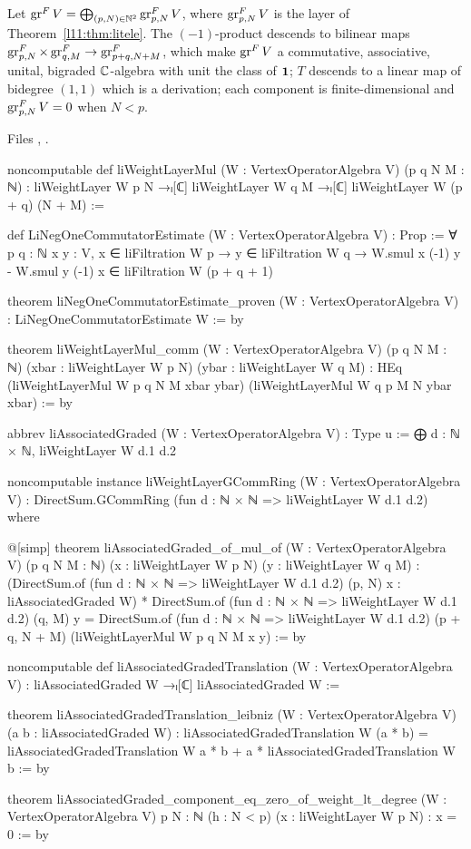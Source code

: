 \begin{theorem}\label{l11:thm:ligr}
Let $\operatorname{gr}^FV = \bigoplus_{(p,N)\in{\mathbb{N}}^2}\operatorname{gr}^F_{p,N}V$, where $\operatorname{gr}^F_{p,N}V$ is the
layer of Theorem~\ref{l11:thm:litele}. The $(-1)$-product descends to bilinear maps
$\operatorname{gr}^F_{p,N}\times\operatorname{gr}^F_{q,M}\to\operatorname{gr}^F_{p+q,N+M}$, which make $\operatorname{gr}^FV$ a
commutative, associative, unital, bigraded ${\mathbb{C}}$-algebra with unit the class of $\mathbf{1}$; $T$ descends to
a linear map of bidegree $(1,1)$ which is a derivation; each component is finite-dimensional and
$\operatorname{gr}^F_{p,N}V = 0$ when $N<p$.
\end{theorem}
\noindent Files ,
.
\begin{leancode}
noncomputable def liWeightLayerMul (W : VertexOperatorAlgebra V) (p q N M : ℕ) :
    liWeightLayer W p N →ₗ[ℂ]
      liWeightLayer W q M →ₗ[ℂ] liWeightLayer W (p + q) (N + M) :=

def LiNegOneCommutatorEstimate (W : VertexOperatorAlgebra V) : Prop :=
  ∀ {p q : ℕ} {x y : V}, x ∈ liFiltration W p → y ∈ liFiltration W q →
    W.smul x (-1) y - W.smul y (-1) x ∈ liFiltration W (p + q + 1)

theorem liNegOneCommutatorEstimate_proven (W : VertexOperatorAlgebra V) :
    LiNegOneCommutatorEstimate W := by

theorem liWeightLayerMul_comm (W : VertexOperatorAlgebra V) (p q N M : ℕ)
    (xbar : liWeightLayer W p N) (ybar : liWeightLayer W q M) :
    HEq (liWeightLayerMul W p q N M xbar ybar)
      (liWeightLayerMul W q p M N ybar xbar) := by

abbrev liAssociatedGraded (W : VertexOperatorAlgebra V) : Type u :=
  ⨁ d : ℕ × ℕ, liWeightLayer W d.1 d.2

noncomputable instance liWeightLayerGCommRing (W : VertexOperatorAlgebra V) :
    DirectSum.GCommRing (fun d : ℕ × ℕ => liWeightLayer W d.1 d.2) where

@[simp] theorem liAssociatedGraded_of_mul_of (W : VertexOperatorAlgebra V)
    (p q N M : ℕ) (x : liWeightLayer W p N) (y : liWeightLayer W q M) :
    (DirectSum.of (fun d : ℕ × ℕ => liWeightLayer W d.1 d.2) (p, N) x :
        liAssociatedGraded W) *
      DirectSum.of (fun d : ℕ × ℕ => liWeightLayer W d.1 d.2) (q, M) y =
    DirectSum.of (fun d : ℕ × ℕ => liWeightLayer W d.1 d.2) (p + q, N + M)
      (liWeightLayerMul W p q N M x y) := by

noncomputable def liAssociatedGradedTranslation (W : VertexOperatorAlgebra V) :
    liAssociatedGraded W →ₗ[ℂ] liAssociatedGraded W :=

theorem liAssociatedGradedTranslation_leibniz (W : VertexOperatorAlgebra V)
    (a b : liAssociatedGraded W) :
    liAssociatedGradedTranslation W (a * b) =
      liAssociatedGradedTranslation W a * b + a * liAssociatedGradedTranslation W b := by

theorem liAssociatedGraded_component_eq_zero_of_weight_lt_degree
    (W : VertexOperatorAlgebra V) {p N : ℕ} (h : N < p)
    (x : liWeightLayer W p N) : x = 0 := by
\end{leancode}


